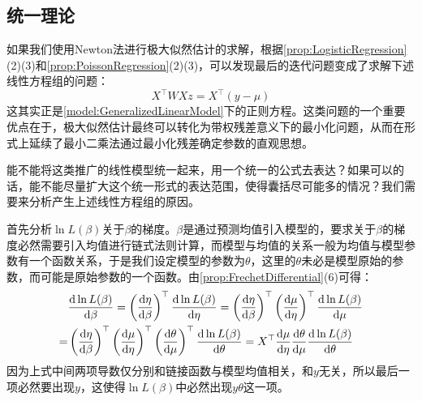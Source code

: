 \subsection{统一理论}
如果我们使用Newton法进行极大似然估计的求解，根据\cref{prop:LogisticRegression}(2)(3)和\cref{prop:PoissonRegression}(2)(3)，可以发现最后的迭代问题变成了求解下述线性方程组的问题：
\begin{equation*}
	X^{\top}WXz=X^{\top}(y-\mu)
\end{equation*}
这其实正是\cref{model:GeneralizedLinearModel}下的正则方程。这类问题的一个重要优点在于，极大似然估计最终可以转化为带权残差意义下的最小化问题，从而在形式上延续了最小二乘法通过最小化残差确定参数的直观思想。\par
能不能将这类推广的线性模型统一起来，用一个统一的公式去表达？如果可以的话，能不能尽量扩大这个统一形式的表达范围，使得囊括尽可能多的情况？我们需要来分析产生上述线性方程组的原因。\par
首先分析$\ln L(\beta)$关于$\beta$的梯度。$\beta$是通过预测均值引入模型的，要求关于$\beta$的梯度必然需要引入均值进行链式法则计算，而模型与均值的关系一般为均值与模型参数有一个函数关系，于是我们设定模型的参数为$\theta$，这里的$\theta$未必是模型原始的参数，而可能是原始参数的一个函数。由\cref{prop:FrechetDifferential}(6)可得：
\begin{align*}
	&\frac{\dif\ln L(\beta)}{\dif\beta}=\left(\frac{\dif\eta}{\dif\beta}\right)^{\top}\frac{\dif\ln L(\beta)}{\dif\eta}=\left(\frac{\dif\eta}{\dif\beta}\right)^{\top}\left(\frac{\dif\mu}{\dif\eta}\right)^{\top}\frac{\dif\ln L(\beta)}{\dif\mu} \\
	=&\left(\frac{\dif\eta}{\dif\beta}\right)^{\top}\left(\frac{\dif\mu}{\dif\eta}\right)^{\top}\left(\frac{\dif\theta}{\dif\mu}\right)^{\top}\frac{\dif\ln L(\beta)}{\dif\theta}=X^{\top}\frac{\dif\mu}{\dif\eta}\frac{\dif\theta}{\dif\mu}\frac{\dif\ln L(\beta)}{\dif\theta}
\end{align*}
因为上式中间两项导数仅分别和链接函数与模型均值相关，和$y$无关，所以最后一项必然要出现$y$，这使得$\ln L(\beta)$中必然出现$y\theta$这一项。